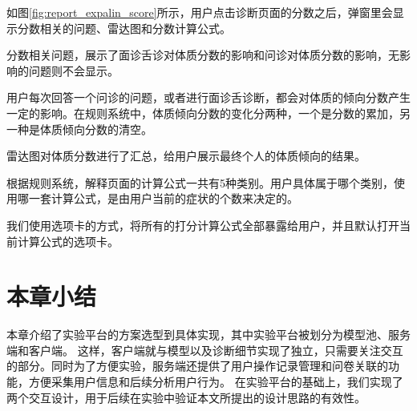 如图\ref{fig:report_expalin_score}所示，用户点击诊断页面的分数之后，弹窗里会显示分数相关的问题、雷达图和分数计算公式。

分数相关问题，展示了面诊舌诊对体质分数的影响和问诊对体质分数的影响，无影响的问题则不会显示。

用户每次回答一个问诊的问题，或者进行面诊舌诊断，都会对体质的倾向分数产生一定的影响。在规则系统中，体质倾向分数的变化分两种，一个是分数的累加，另一种是体质倾向分数的清空。

雷达图对体质分数进行了汇总，给用户展示最终个人的体质倾向的结果。

根据规则系统，解释页面的计算公式一共有5种类别。用户具体属于哪个类别，使用哪一套计算公式，是由用户当前的症状的个数来决定的。

我们使用选项卡的方式，将所有的打分计算公式全部暴露给用户，并且默认打开当前计算公式的选项卡。






\section{本章小结}
本章介绍了实验平台的方案选型到具体实现，其中实验平台被划分为模型池、服务端和客户端。
这样，客户端就与模型以及诊断细节实现了独立，只需要关注交互的部分。同时为了方便实验，服务端还提供了用户操作记录管理和问卷关联的功能，方便采集用户信息和后续分析用户行为。
在实验平台的基础上，我们实现了两个交互设计，用于后续在实验中验证本文所提出的设计思路的有效性。